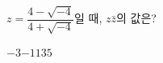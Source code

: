 $z=\dfrac{4-\sqrt{-4}}{4+\sqrt{-4}}$일 때, $z\bar{z}$의 값은? 
\begin{choices32}{$-3$}{$-1$}{$1$}{$3$}{$5$}\end{choices32}
